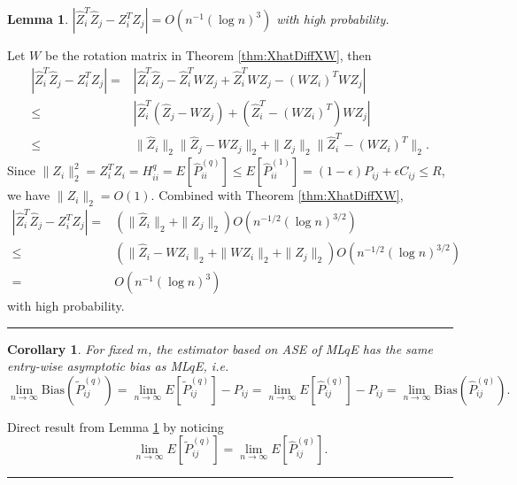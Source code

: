 \documentclass[a4paper]{article}
\newenvironment{proof}{{\bf Proof:  }}{\hfill\rule{2mm}{2mm}}
\newtheorem{lemma}[fact]{Lemma}
\newtheorem{corollary}[fact]{Corollary}
\begin{document}
\begin{lemma}
\label{lemma:1stMomentPhatDiffLq}
$\left|  \hat{Z}_i^T \hat{Z}_j - Z_i^T Z_j \right| = O(n^{-1} (\log n)^{3})$ with high probability.
\end{lemma}
\begin{proof}
Let $W$ be the rotation matrix in Theorem \ref{thm:XhatDiffXW}, then
\begin{align*}
	\left|  \hat{Z}_i^T \hat{Z}_j - Z_i^T Z_j \right|
    = & \left| \hat{Z}_i^T \hat{Z}_j - \hat{Z}_i^T W Z_j + \hat{Z}_i^T W Z_j - (W Z_i)^T W Z_j \right| \\
    \le & \left| \hat{Z}_i^T (\hat{Z}_j - W Z_j) + (\hat{Z}_i^T - (W Z_i)^T) W Z_j \right| \\
    \le & \|\hat{Z}_i\|_2 \|\hat{Z}_j - W Z_j\|_2 + \|Z_j\|_2 \|\hat{Z}_i^T - (W Z_i)^T\|_2.
\end{align*}
Since $\|Z_i\|_2^2 = Z_i^T Z_i = H^{q}_{ii} = E[\hat{P}^{(q)}_{ii}] \le E[\hat{P}^{(1)}_{ii}] = (1-\epsilon) P_{ij} + \epsilon C_{ij} \le R$, we have $\|Z_i\|_2 = O(1)$.
Combined with Theorem \ref{thm:XhatDiffXW},
\begin{align*}
    \left|  \hat{Z}_i^T \hat{Z}_j - Z_i^T Z_j \right|
    = & (\|\hat{Z}_i\|_2 + \|Z_j\|_2) O(n^{-1/2} (\log n)^{3/2}) \\
    \le & (\|\hat{Z}_i - W Z_i\|_2 + \|W Z_i\|_2 + \|Z_j\|_2) O(n^{-1/2} (\log n)^{3/2}) \\
    = & O(n^{-1} (\log n)^{3})
\end{align*}
with high probability.
\end{proof}




\begin{corollary}
\label{cor:LqConsistent}
For fixed $m$, the estimator based on ASE of ML$q$E has the same entry-wise asymptotic bias as ML$q$E, i.e.
\[
	\lim_{n \to \infty} \mathrm{Bias}(\widetilde{P}_{ij}^{(q)}) = \lim_{n \to \infty} E[\widetilde{P}_{ij}^{(q)}] - P_{ij} = \lim_{n \to \infty} E[\hat{P}^{(q)}_{ij}] - P_{ij}
    = \lim_{n \to \infty} \mathrm{Bias}(\hat{P}_{ij}^{(q)}).
\]
\end{corollary}
\begin{proof}
Direct result from Lemma \ref{lemma:1stMomentPhatDiffLq} by noticing
\[
	\lim_{n \to \infty} E[\widetilde{P}_{ij}^{(q)}] = \lim_{n \to \infty} E[\hat{P}^{(q)}_{ij}].
\]
\end{proof}
\end{document}
